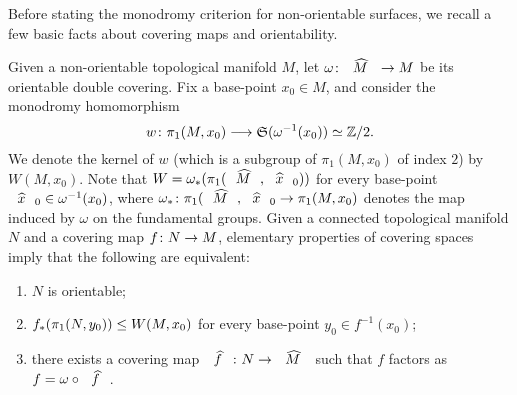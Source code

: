 Before stating the monodromy criterion for non-orientable surfaces, we recall a few basic facts about covering maps and orientability.

Given a non-orientable topological manifold $M$, let $\map{\omega}{\what{M}}{M}$ be its orientable double covering. Fix a base-point $x_0\in M$, and consider the monodromy homomorphism
\[
\map{w}{\pi_1(M,x_0)}{\symgroup(\omega^{-1}(x_0))\iso\ZZ/2}.
\]
We denote the kernel of $w$ (which is a subgroup of $\pi_1(M,x_0)$ of index $2$) by $W(M,x_0)$. Note that $W=\omega_\ast(\pi_1(\what{M},\what{x}_0))$ for every base-point $\what{x}_0\in\omega^{-1}(x_0)$, where $\map{\omega_\ast}{\pi_1(\what{M},\what{x}_0}{\pi_1(M,x_0)}$ denotes the map induced by $\omega$ on the fundamental groups. Given a connected topological manifold $N$ and a covering map $\map{f}{N}{M}$, elementary properties of covering spaces imply that the following are equivalent:
\begin{enumerate}
\item $N$ is orientable;
\item $f_\ast(\pi_1(N,y_0))\le W(M,x_0)$ for every base-point $y_0\in f^{-1}(x_0)$;
\item there exists a covering map $\map{\what{f}}{N}{\what{M}}$ such that $f$ factors as $f=\omega\circ\what{f}$.
\end{enumerate}

